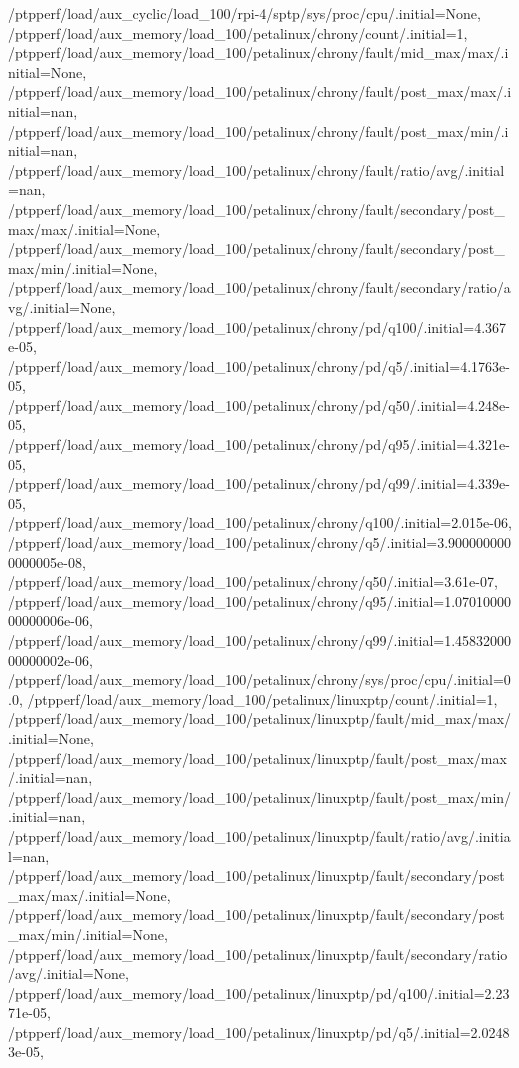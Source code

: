 {    /ptpperf/load/aux_cyclic/load_100/rpi-4/sptp/sys/proc/cpu/.initial=None,
    /ptpperf/load/aux_memory/load_100/petalinux/chrony/count/.initial=1,
    /ptpperf/load/aux_memory/load_100/petalinux/chrony/fault/mid_max/max/.initial=None,
    /ptpperf/load/aux_memory/load_100/petalinux/chrony/fault/post_max/max/.initial=nan,
    /ptpperf/load/aux_memory/load_100/petalinux/chrony/fault/post_max/min/.initial=nan,
    /ptpperf/load/aux_memory/load_100/petalinux/chrony/fault/ratio/avg/.initial=nan,
    /ptpperf/load/aux_memory/load_100/petalinux/chrony/fault/secondary/post_max/max/.initial=None,
    /ptpperf/load/aux_memory/load_100/petalinux/chrony/fault/secondary/post_max/min/.initial=None,
    /ptpperf/load/aux_memory/load_100/petalinux/chrony/fault/secondary/ratio/avg/.initial=None,
    /ptpperf/load/aux_memory/load_100/petalinux/chrony/pd/q100/.initial=4.367e-05,
    /ptpperf/load/aux_memory/load_100/petalinux/chrony/pd/q5/.initial=4.1763e-05,
    /ptpperf/load/aux_memory/load_100/petalinux/chrony/pd/q50/.initial=4.248e-05,
    /ptpperf/load/aux_memory/load_100/petalinux/chrony/pd/q95/.initial=4.321e-05,
    /ptpperf/load/aux_memory/load_100/petalinux/chrony/pd/q99/.initial=4.339e-05,
    /ptpperf/load/aux_memory/load_100/petalinux/chrony/q100/.initial=2.015e-06,
    /ptpperf/load/aux_memory/load_100/petalinux/chrony/q5/.initial=3.9000000000000005e-08,
    /ptpperf/load/aux_memory/load_100/petalinux/chrony/q50/.initial=3.61e-07,
    /ptpperf/load/aux_memory/load_100/petalinux/chrony/q95/.initial=1.0701000000000006e-06,
    /ptpperf/load/aux_memory/load_100/petalinux/chrony/q99/.initial=1.4583200000000002e-06,
    /ptpperf/load/aux_memory/load_100/petalinux/chrony/sys/proc/cpu/.initial=0.0,
    /ptpperf/load/aux_memory/load_100/petalinux/linuxptp/count/.initial=1,
    /ptpperf/load/aux_memory/load_100/petalinux/linuxptp/fault/mid_max/max/.initial=None,
    /ptpperf/load/aux_memory/load_100/petalinux/linuxptp/fault/post_max/max/.initial=nan,
    /ptpperf/load/aux_memory/load_100/petalinux/linuxptp/fault/post_max/min/.initial=nan,
    /ptpperf/load/aux_memory/load_100/petalinux/linuxptp/fault/ratio/avg/.initial=nan,
    /ptpperf/load/aux_memory/load_100/petalinux/linuxptp/fault/secondary/post_max/max/.initial=None,
    /ptpperf/load/aux_memory/load_100/petalinux/linuxptp/fault/secondary/post_max/min/.initial=None,
    /ptpperf/load/aux_memory/load_100/petalinux/linuxptp/fault/secondary/ratio/avg/.initial=None,
    /ptpperf/load/aux_memory/load_100/petalinux/linuxptp/pd/q100/.initial=2.2371e-05,
    /ptpperf/load/aux_memory/load_100/petalinux/linuxptp/pd/q5/.initial=2.02483e-05,
}
